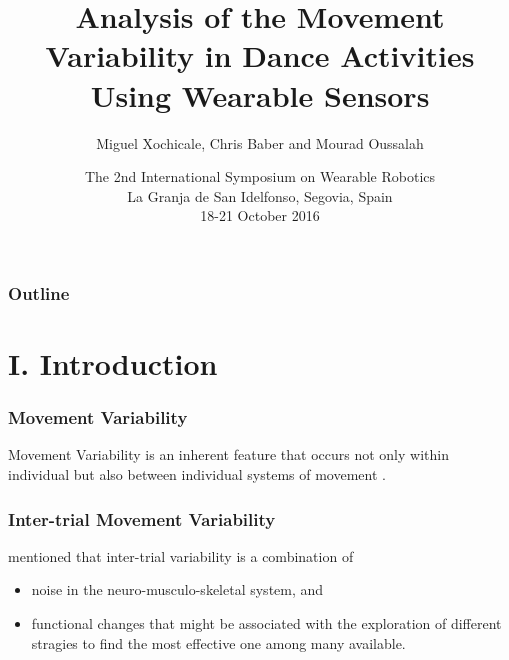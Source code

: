 \documentclass{beamer}
\title[Analysis of the Movement Variability in Dance Activities Using Wearable Sensors]
{Analysis of the Movement Variability in Dance Activities Using Wearable Sensors}
\author[Miguel Xochicale]
{   %
    Miguel Xochicale\inst{1}, Chris Baber\inst{1} and Mourad Oussalah\inst{2}
}
\institute[CVC-IIIA]
{   %

      \vspace{5mm}
    \begin{tabular}{c}
    \inst{1} School of Electronic, Electrical and System Engineering, University of Birmingham, U.K. \\
    \inst{2} Center for Ubiquitous Computing, University of Oulu, Finland
    \end{tabular}
}
\date[DEMO-2013]
{   %
      \vspace{5mm}
     The 2nd International Symposium on Wearable Robotics \\
     La Granja de San Idelfonso, Segovia, Spain \\
     18-21 October 2016
}
\begin{document}
\frame{\titlepage}





\begin{frame}
\frametitle{Outline}
\tableofcontents
\end{frame}




\section{I. Introduction}








\begin{frame}
\frametitle{Movement Variability}

Movement Variability is an inherent feature that occurs not only within individual
but also between individual systems of movement  \textcolor{red}{\textbf{ \cite{newell1993variability}   }}.

\end{frame}


\begin{frame}
\frametitle{Inter-trial Movement Variability}

\textcolor{red}{\textbf{  \cite{Preatoni2013}   }} mentioned that
 inter-trial variability is a combination of
\begin{itemize}
    \item noise in the neuro-musculo-skeletal system, and
    \item functional changes that might be associated with the exploration of different
stragies to find the most effective one among many available.
\end{itemize}



\end{frame}
\end{document}
